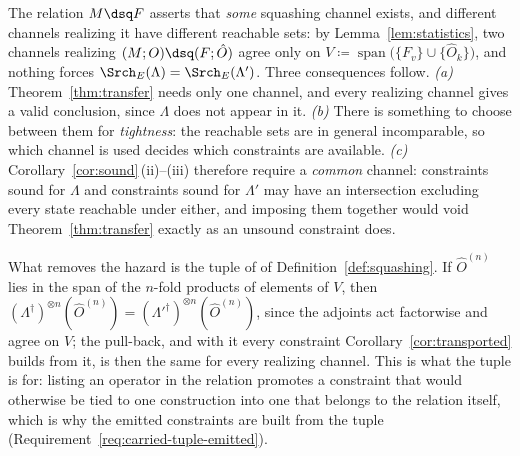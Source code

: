
\begin{remark}\label{rem:channel-choice}
The relation $M\dsq F$ asserts that \emph{some} squashing channel exists, and
different channels realizing it have different reachable sets: by
Lemma~\ref{lem:statistics}, two channels realizing
$(M;O)\dsq(F;\hat O)$ agree only on
$V\coloneqq\operatorname{span}\big(\{F_v\}\cup\{\hat O_k\}\big)$, and nothing
forces $\Srch_E(\Lambda)=\Srch_E(\Lambda')$. Three consequences follow.
\emph{(a)} Theorem~\ref{thm:transfer} needs only one channel, and every
realizing channel gives a valid conclusion, since $\Lambda$ does not appear in
it. \emph{(b)} There is something to choose between them for
\emph{tightness}: the reachable sets are in general incomparable, so which
channel is used decides which constraints are available. \emph{(c)}
Corollary~\ref{cor:sound}\,(ii)--(iii) therefore require a \emph{common}
channel: constraints sound for $\Lambda$ and constraints sound for $\Lambda'$
may have an intersection excluding every state reachable under either, and
imposing them together would void Theorem~\ref{thm:transfer} exactly as an
unsound constraint does.

What removes the hazard is the tuple of  of
Definition~\ref{def:squashing}. If $\hat O^{(n)}$ lies in the span of the
$n$-fold products of elements of $V$, then
$(\Lambda^{\dagger})^{\otimes n}(\hat O^{(n)})
=(\Lambda'^{\dagger})^{\otimes n}(\hat O^{(n)})$, since the adjoints act
factorwise and agree on $V$; the pull-back, and with it every constraint
Corollary~\ref{cor:transported} builds from it, is then the same for every
realizing channel. This is what the tuple is for: listing an operator in the
relation promotes a constraint that would otherwise be tied to one construction
into one that belongs to the relation itself, which is why the emitted
constraints are built from the tuple
(Requirement~\ref{req:carried-tuple-emitted}).
\end{remark}
